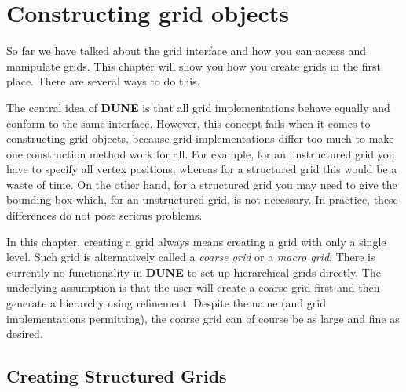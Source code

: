 \documentclass[11pt,a4paper,headinclude,footinclude,DIV16,normalheadings]{scrreprt}
\newcommand{\Dune}{{\sf\bfseries DUNE}\xspace}
\begin{document}
\chapter{Constructing grid objects}

So far we have talked about the grid interface and how you can access and
manipulate grids.  This chapter will show you how you create grids in the
first place.  There are several ways to do this.

The central idea of \Dune is that all grid implementations behave equally
and conform to the same interface.  However, this concept fails when it
comes to constructing grid objects, because grid implementations differ too
much to make one construction method work for all.  For example, for an
unstructured grid you have to specify all vertex positions, whereas for a
structured grid this would be a waste of time.  On the other hand, for
a structured grid you may need to give the bounding box which, for an
unstructured grid, is not necessary.  In practice, these differences do
not pose serious problems.

In this chapter, creating a grid always means creating a grid with only
a single level.  Such grid is alternatively called a {\em coarse grid}
or a {\em macro grid}.  There is currently no functionality in \Dune to
set up hierarchical grids directly.  The underlying assumption is that
the user will create a coarse grid first and then generate a hierarchy
using refinement.  Despite the name (and grid implementations permitting),
the coarse grid can of course be as large and fine as desired.

\section{Creating Structured Grids}
\end{document}
